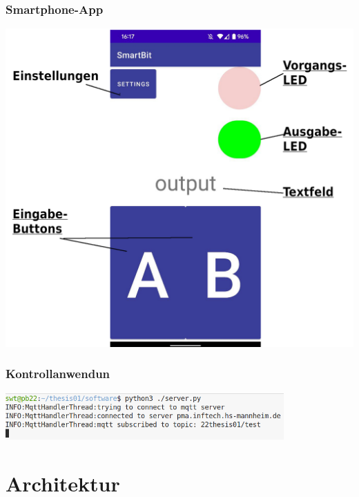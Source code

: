 \documentclass{beamer}
\begin{document}
\begin{frame}
    \frametitle{Smartphone-App}
    \centering
    \includegraphics[height=0.8\textheight]{images/app_initial.png}
\end{frame}

\begin{frame}[fragile]
    \frametitle{Kontrollanwendun}
    \begin{center}
    \includegraphics[width=0.8\textwidth]{images/middleware.png}
    \end{center}
\end{frame}

\section{Architektur}
\end{document}
